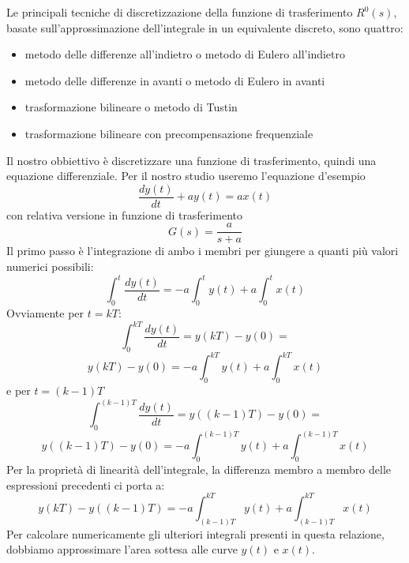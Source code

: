 \documentclass[a4paper]{report}
\begin{document}
Le principali tecniche di discretizzazione della funzione di
trasferimento $R^{0}(s)$, basate sull'approssimazione dell'integrale
in un equivalente discreto, sono quattro:
\begin{itemize}
\item metodo delle differenze all'indietro o metodo di Eulero
  all'indietro
\item metodo delle differenze in avanti o metodo di Eulero in avanti
\item trasformazione bilineare o metodo di Tustin
\item trasformazione bilineare con precompensazione frequenziale
\end{itemize}

Il nostro obbiettivo \`e discretizzare una funzione di trasferimento,
quindi una equazione differenziale. Per il nostro studio useremo
l'equazione d'esempio
\begin{equation}\label{eq:discretizzazione02}
  \dfrac{dy(t)}{dt} + ay(t) = ax(t)
\end{equation}
con relativa versione in funzione di trasferimento
\begin{equation}\label{eq:discretizzazione01}
  G(s) = \dfrac{a}{s + a}
\end{equation}
Il primo passo \`e l'integrazione di ambo i membri per giungere a quanti
pi\`u valori numerici possibili:
\[
\int_{0}^{t} \dfrac{dy(t)}{dt} = - a\int_{0}^{t} y(t) +
a\int_{0}^{t}x(t) 
\]
Ovviamente per $t = kT$:
\[
\int_{0}^{kT} \dfrac{dy(t)}{dt} = y(kT) - y(0) =
\]
\[
y(kT) - y(0) = - a\int_{0}^{kT} y(t) + a\int_{0}^{kT}x(t) 
\]
e per $t = (k - 1)T$
\[
\int_{0}^{(k - 1)T} \dfrac{dy(t)}{dt} = y((k - 1)T) - y(0) =
\]
\[
y((k - 1)T) - y(0) = - a\int_{0}^{(k - 1)T} y(t) + a\int_{0}^{(k -
  1)T}x(t)
\]
Per la propriet\`a di linearit\`a dell'integrale, la differenza
membro a membro delle espressioni precedenti ci porta a:
\begin{equation}\label{eq:discretizzazione00}
y(kT) - y((k - 1)T) = - a\int_{(k - 1)T}^{kT} y(t) + a\int_{(k -
  1)T}^{kT}x(t) 
\end{equation}
Per calcolare numericamente gli ulteriori integrali presenti in questa
relazione, dobbiamo approssimare l'area sottesa alle curve $y(t)$ e
$x(t)$.
\end{document}
